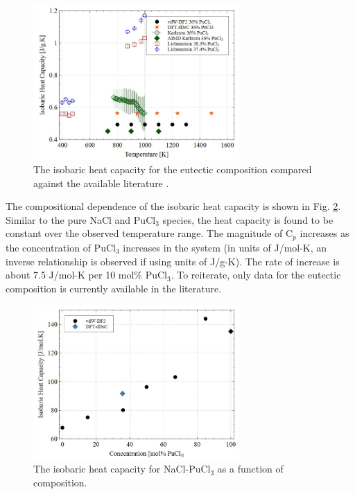 \documentclass[review]{elsarticle}
\begin{document}
\begin{figure}[h!]
 \centering
 \includegraphics[width=0.7\textwidth]{Cp_eut.jpg} 
 \caption{The isobaric heat capacity for the eutectic composition compared against the available literature \cite{karlsson2022synthesis,lichtenstein2022property}.}
 \label{fig:Cp_eut}
\end{figure}

The compositional dependence of the isobaric heat capacity is shown in Fig. \ref{fig:Cp}. Similar to the pure NaCl and PuCl$_3$ species, the heat capacity is found to be constant over the observed temperature range. The magnitude of C$_p$ increases as the concentration of PuCl$_3$ increases in the system (in units of J/mol-K, an inverse relationship is observed if using units of J/g-K). The rate of increase is about 7.5 J/mol-K per 10 mol\% PuCl$_3$. To reiterate, only data for the eutectic composition is currently available in the literature. 

\begin{figure}[h!]
 \centering
 \includegraphics[width=0.7\textwidth]{Cp.jpg} 
 \caption{The isobaric heat capacity for NaCl-PuCl$_3$ as a function of composition.}
 \label{fig:Cp}
\end{figure} 
\end{document}
